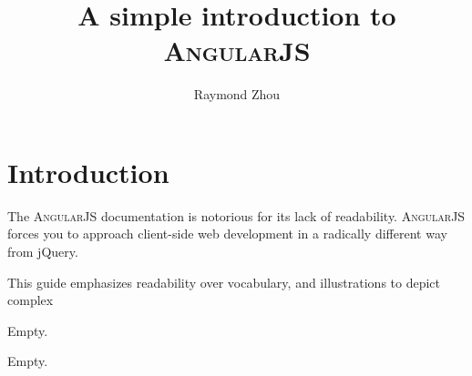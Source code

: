 \documentclass[12pt]{article}
\title{A simple introduction to \textsc{AngularJS}}
\author{Raymond Zhou}
\begin{document}
\fancyhf{}
\fancyfoot[C]{\thepage}
\renewcommand{\footrulewidth}{0.4pt}  %

\maketitle{}
\date{}

\section{Introduction}

The \textsc{AngularJS} documentation is notorious for its lack of readability. \textsc{AngularJS} forces you to approach client-side web development in a radically different way from jQuery.

This guide emphasizes readability over vocabulary, and illustrations to depict complex


\newpage{}

Empty.

\newpage{}

Empty.
\end{document}
